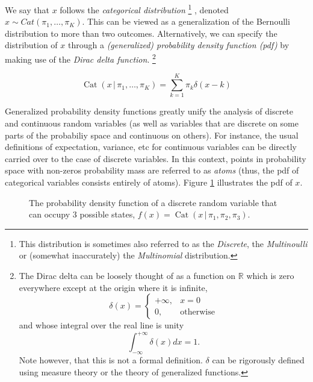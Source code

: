 \documentclass[final,3p,times,twocolumn]{elsarticle}
\DeclareMathOperator*{\Cat}{Cat}
\begin{document}
We say that $x$ follows the \emph{categorical distribution}
\footnote{This distribution is sometimes also referred to as the \emph{Discrete}, the \emph{Multinoulli} or (somewhat inaccurately) the \emph{Multinomial} distribution.}
, denoted $x \sim Cat(\pi_1, \dots, \pi_K)$.
This can be viewed as a generalization of the Bernoulli distribution to more than two outcomes.
Alternatively, we can specify the distribution of $x$ through a \emph{(generalized) probability density function (pdf)} by making use of the \emph{Dirac delta function}.
\footnote{The Dirac delta can be loosely thought of as a function on $\mathbb{R}$ which is zero everywhere except at the origin where it is infinite,
\[\delta(x) = \left\{
\begin{array}{ll}
+\infty, & x = 0\\
0, & \mbox{otherwise}
\end{array} \right.\]
and whose integral over the real line is unity
\[ \int_{-\infty}^{+\infty}\delta(x)dx = 1.\]
Note however, that this is not a formal definition. $\delta$ can be rigorously defined using measure theory or the theory of generalized functions.}

\begin{equation}
\label{eqn:catpdf}
\Cat(x\,|\,\pi_1,\dots,\pi_K) = \sum_{k=1}^K \pi_k \delta(x - k)
\end{equation}

Generalized probability density functions greatly unify the analysis of discrete and continuous random variables (as well as variables that are discrete on some parts of the probabiliy space and continuous on others).
For instance, the usual definitions of expectation, variance, etc for continuous variables can be directly carried over to the case of discrete variables.
In this context, points in probability space with non-zeros probability mass are referred to as \emph{atoms} (thus, the pdf of categorical variables consists entirely of atoms).
Figure \ref{fig:pmf} illustrates the pdf of $x$.

\begin{figure}
\caption{The probability density function of a discrete random variable that can occupy 3 possible states, $f(x) = \Cat(x\,|\,\pi_1,\pi_2,\pi_3)$.}
\label{fig:pmf}
\end{figure}
\end{document}
